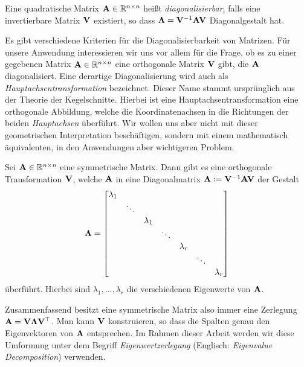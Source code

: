 \begin{defn}
Eine quadratische Matrix $\mathbf{A} \in \mathbb{R}^{n \times n}$ heißt \textit{diagonalisierbar}, falls eine invertierbare Matrix $\mathbf{V}$ existiert, so dass $\mathbf{\Lambda} = \mathbf{V}^{-1}\mathbf{A}\mathbf{V}$ Diagonalgestalt hat.
\end{defn}

Es gibt verschiedene Kriterien für die Diagonalisierbarkeit von Matrizen. Für unsere Anwendung interessieren wir uns vor allem für die Frage, ob es zu einer gegebenen Matrix $\mathbf{A} \in \mathbb{R}^{n \times n}$ eine orthogonale Matrix $\mathbf{V}$ gibt, die $\mathbf{A}$ diagonalisiert. Eine derartige Diagonalisierung wird auch als \textit{Hauptachsentransformation} bezeichnet. Dieser Name stammt ursprünglich aus der Theorie der Kegelschnitte. Hierbei ist eine Hauptachsentransformation eine orthogonale Abbildung, welche die Koordinatenachsen in die Richtungen der beiden \textit{Hauptachsen} überführt. Wir wollen uns aber nicht mit dieser geometrischen Interpretation beschäftigen, sondern mit einem mathematisch äquivalenten, in den Anwendungen aber wichtigeren Problem.

\begin{thm}
Sei $\mathbf{A} \in \mathbb{R}^{n \times n}$ eine symmetrische Matrix. Dann gibt es eine orthogonale Transformation $\mathbf{V}$, welche $\mathbf{A}$ in eine Diagonalmatrix $\mathbf{\Lambda} \vcentcolon= \mathbf{V}^{-1}\mathbf{A}\mathbf{V}$ der Gestalt
$$\mathbf{\Lambda} = \begin{bmatrix}
    \lambda_{1} & & & & & & \\
    & \ddots & & & & & \\
    & & \lambda_1 & & & & \\
    & & & \ddots & & & \\
    & & & &\lambda_r & & \\
    & & & & & \ddots & \\
    & & & & & & \lambda_{r}
  \end{bmatrix}$$
überführt. Hierbei sind $\lambda_1, \ldots, \lambda_r$ die verschiedenen Eigenwerte von $\mathbf{A}$.
\end{thm}

Zusammenfassend besitzt eine symmetrische Matrix also immer eine Zerlegung $\mathbf{A} = \mathbf{V} \mathbf{\Lambda} \mathbf{V}^{\top}$. Man kann $\mathbf{V}$ konstruieren, so dass die Spalten genau den Eigenvektoren von $\mathbf{A}$ entsprechen. Im Rahmen dieser Arbeit werden wir diese Umformung unter dem Begriff \textit{Eigenwertzerlegung} (Englisch: \textit{Eigenvalue Decomposition}) verwenden. 

